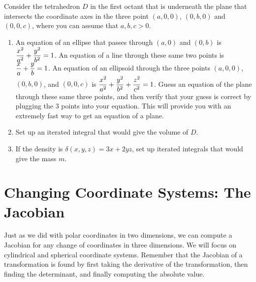 \begin{problem}
 Consider the tetrahedron $D$ in the first octant that is underneath the plane that intersects the coordinate axes in the three point $(a,0,0)$, $(0,b,0)$ and $(0,0,c)$, where you can assume that $a,b,c>0$.  
 \begin{enumerate}
  \item An equation of an ellipse that passes through $(a,0)$ and $(0,b)$ is $\displaystyle\frac{x^2}{a^2}+\frac{y^2}{b^2}=1$.  An equation of a line through these same two points is $\displaystyle\frac{x}{a}+\frac{y}{b}=1$.  An equation of an ellipsoid through the three points $(a,0,0)$, $(0,b,0)$, and $(0,0,c)$ is $\displaystyle\frac{x^2}{a^2}+\frac{y^2}{b^2}+\frac{z^2}{c^2}=1$. Guess an equation of the plane through these same three points, and then verify that your guess is correct by plugging the 3 points into your equation. This will provide you with an extremely fast way to get an equation of a plane.
  \item Set up an iterated integral that would give the volume of $D$.
  \item If the density is $\delta(x,y,z) = 3x+2yz$, set up iterated integrals that would give the mass $m$.
 \end{enumerate}
\end{problem}




\section{Changing Coordinate Systems: The Jacobian}

Just as we did with polar coordinates in two dimensions, we can compute a Jacobian for any change of coordinates in three dimensions.  We will focus on cylindrical and spherical coordinate systems. Remember that the Jacobian of a transformation is found by first taking the derivative of the transformation, then finding the determinant, and finally computing the absolute value.

